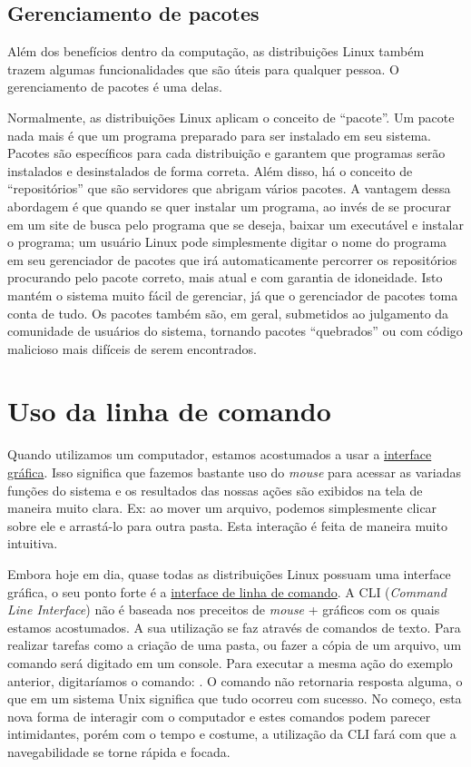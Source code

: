 \documentclass{handout_utfpr}
\newcommand{\com}[1]{
\colorbox{light-gray}{\texttt{\pbox{\textwidth}{\$ #1}}}
}
\begin{document}
\subsection{Gerenciamento de pacotes}
Além dos benefícios dentro da computação, as distribuições Linux também trazem algumas funcionalidades que são úteis para qualquer pessoa. O gerenciamento de pacotes é uma delas.

Normalmente, as distribuições Linux aplicam o conceito de ``pacote''. Um pacote nada mais é que um programa preparado para ser instalado em seu sistema. Pacotes são específicos para cada distribuição e garantem que programas serão instalados e desinstalados de forma correta. Além disso, há o conceito de ``repositórios'' que são servidores que abrigam vários pacotes. A vantagem dessa abordagem é que quando se quer instalar um programa, ao invés de se procurar em um site de busca pelo programa que se deseja, baixar um executável e instalar o programa; um usuário Linux pode simplesmente digitar o nome do programa em seu gerenciador de pacotes que irá automaticamente percorrer os repositórios procurando pelo pacote correto, mais atual e com garantia de idoneidade. Isto mantém o sistema muito fácil de gerenciar, já que o gerenciador de pacotes toma conta de tudo. Os pacotes também são, em geral, submetidos ao julgamento da comunidade de usuários do sistema, tornando pacotes ``quebrados'' ou com código malicioso mais difíceis de serem encontrados.

\section{Uso da linha de comando}

Quando utilizamos um computador, estamos acostumados a usar a \underline{interface gráfica}. Isso significa que fazemos bastante uso do \textit{mouse} para acessar as variadas funções do sistema e os resultados das nossas ações são exibidos na tela de maneira muito clara. Ex: ao mover um arquivo, podemos simplesmente clicar sobre ele e arrastá-lo para outra pasta. Esta interação é feita de maneira muito intuitiva.

Embora hoje em dia, quase todas as distribuições Linux possuam uma interface gráfica, o seu ponto forte é a \underline{interface de linha de comando}. A CLI (\emph{Command Line Interface}) não é baseada nos preceitos de \textit{mouse} + gráficos com os quais estamos acostumados. A sua utilização se faz através de comandos de texto. Para realizar tarefas como a criação de uma pasta, ou fazer a cópia de um arquivo, um comando será digitado em um console. Para executar a mesma ação do exemplo anterior, digitaríamos o comando: \com{mv local\_arquivo local\_destino}. O comando não retornaria resposta alguma, o que em um sistema Unix significa que tudo ocorreu com sucesso. No começo, esta nova forma de interagir com o computador e estes comandos podem parecer intimidantes, porém com o tempo e costume, a utilização da CLI fará com que a navegabilidade se torne rápida e focada.
\end{document}
